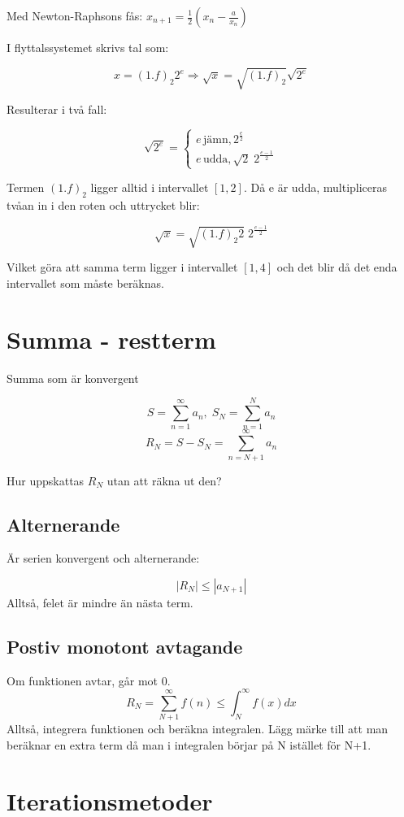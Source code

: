 \documentclass[12pt,a4paper]{article}
\begin{document}
Med Newton-Raphsons fås:
$ x_{n+1} = \frac{1}{2}(x_n-\frac{a}{x_n})$

I flyttalssystemet skrivs tal som:

$$ x = (1.f)_2 2^e \Rightarrow \sqrt{x} = \sqrt{(1.f)_2} \sqrt{2^e} $$

Resulterar i två fall:

\Large
$$
\sqrt{2^e} = \begin{cases}
               e\, \text{jämn}, 2^{\frac{e}{2}}\\
               e\, \text{udda}, \sqrt{2}\;2^{\frac{e-1}{2}}
            \end{cases}
$$

\large
Termen $(1.f)_2$ ligger alltid i intervallet $[1,2]$. Då e är udda, multipliceras tvåan in i den roten och uttrycket blir:

$$ \sqrt{x} = \sqrt{(1.f)_2 2}\;2^{\frac{e-1}{2}} $$

Vilket göra att samma term ligger i intervallet $[1,4]$ och det blir då det enda intervallet som måste beräknas.




\section{Summa - restterm}
Summa som är konvergent

$$ S = \sum_{n=1}^{\infty} a_n, \;
 S_N = \sum_{n=1}^{N} a_n$$
$$ R_N = S - S_N = \sum_{n=N+1}^{\infty} a_n $$

Hur uppskattas $R_N$ utan att räkna ut den?

\subsection{Alternerande}
Är serien konvergent och alternerande:

$$ |R_N| \leq |a_{N+1}|$$
Alltså, felet är mindre än nästa term.

\subsection{Postiv monotont avtagande}
Om funktionen avtar, går mot 0.
$$ R_N = \sum_{N+1}^{\infty} f(n) \leq \int_{N}^{\infty} f(x) dx $$
Alltså, integrera funktionen och beräkna integralen.
Lägg märke till att man beräknar en extra term då man i integralen börjar på N istället för N+1.

\section{Iterationsmetoder}
\end{document}
